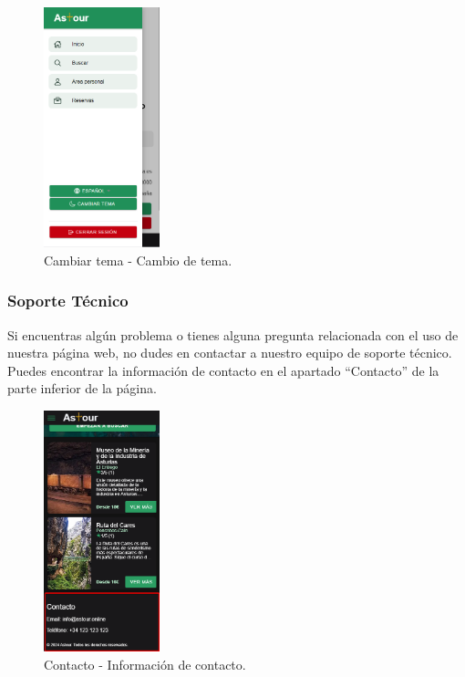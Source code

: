 \begin{enumerate}
	      \begin{figure}[H]
		      \centering
		      \includegraphics[width=0.3\textwidth]{7-Construccion/Manuales/mobile/tema claro.png}
		      \caption{Cambiar tema - Cambio de tema.}
	      \end{figure}
\end{enumerate}

\subsubsection{Soporte Técnico}
Si encuentras algún problema o tienes alguna pregunta relacionada con el uso de nuestra página web, no dudes en contactar a nuestro equipo de soporte técnico.
Puedes encontrar la información de contacto en el apartado “Contacto” de la parte inferior de la página.
\begin{figure}[H]
	\centering
	\includegraphics[width=0.3\textwidth]{7-Construccion/Manuales/mobile/contacto.png}
	\caption{Contacto - Información de contacto.}
\end{figure}